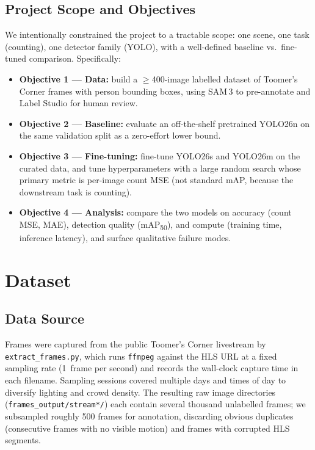 \documentclass{article}
\begin{document}
\subsection{Project Scope and Objectives}
We intentionally constrained the project to a tractable scope: one
scene, one task (counting), one detector family (YOLO), with a
well-defined baseline vs.\ fine-tuned comparison. Specifically:
\begin{itemize}[leftmargin=1.5em]
    \item \textbf{Objective 1 --- Data:} build a $\geq$400-image
    labelled dataset of Toomer's Corner frames with person bounding
    boxes, using SAM\,3 to pre-annotate and Label Studio for human
    review.
    \item \textbf{Objective 2 --- Baseline:} evaluate an
    off-the-shelf pretrained YOLO26n on the same validation split
    as a zero-effort lower bound.
    \item \textbf{Objective 3 --- Fine-tuning:} fine-tune YOLO26s
    and YOLO26m on the curated data, and tune hyperparameters with
    a large random search whose primary metric is per-image count
    MSE (not standard mAP, because the downstream task is counting).
    \item \textbf{Objective 4 --- Analysis:} compare the two models
    on accuracy (count MSE, MAE), detection quality (mAP\textsubscript{50}),
    and compute (training time, inference latency), and surface
    qualitative failure modes.
\end{itemize}

\section{Dataset}
\subsection{Data Source}
Frames were captured from the public Toomer's Corner livestream by
\texttt{extract\_frames.py}, which runs \texttt{ffmpeg} against the
HLS URL at a fixed sampling rate (1~frame per second) and records
the wall-clock capture time in each filename. Sampling sessions
covered multiple days and times of day to diversify lighting and
crowd density. The resulting raw image directories
(\texttt{frames\_output/stream*/}) each contain several thousand
unlabelled frames; we subsampled roughly 500 frames for annotation,
discarding obvious duplicates (consecutive frames with no visible
motion) and frames with corrupted HLS segments.
\end{document}
